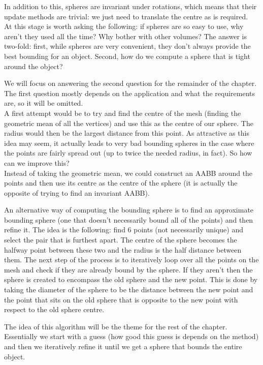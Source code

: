     In addition to this, spheres are invariant under rotations, which means that
    their update methods are trivial: we just need to translate the centre as is
    required.\\
    At this stage is worth asking the following: if spheres are so easy to use,
    why aren't they used all the time? Why bother with other volumes? The answer
    is two-fold: first, while spheres are very convenient, they don't always
    provide the best bounding for an object. Second, how do we compute a sphere
    that is tight around the object?

    We will focus on answering the second question for the remainder of the
    chapter. The first question mostly depends on the application and what the
    requirements are, so it will be omitted.\\
    A first attempt would be to try and find the centre of the mesh (finding
    the geometric mean of all the vertices) and use this as the centre of
    our sphere. The radius would then be the largest distance from this
    point. As attractive as this idea may seem, it actually leads to very
    bad bounding spheres in the case where the points are fairly spread out (up
    to twice the needed radius, in fact). So how can we improve this?\\
    Instead of taking the geometric mean, we could construct an AABB around the
    points and then use its centre as the centre of the sphere (it is actually
    the opposite of trying to find an invariant AABB).

    An alternative way of computing the bounding sphere is to find an
    approximate bounding sphere (one that doesn't necessarily bound all of
    the points) and then refine it. The idea is the following: find 6 points
    (not necessarily unique) and select the pair that is furthest apart. The
    centre of the sphere becomes the halfway point between these two and the
    radius is the half distance between them. The next step of the process
    is to iteratively loop over all the points on the mesh and check if they
    are already bound by the sphere. If they aren't then the sphere is
    created to encompass the old sphere and the new point. This is done by
    taking the diameter of the sphere to be the distance between the new
    point and the point that sits on the old sphere that is opposite to the
    new point with respect to the old sphere centre.

    The idea of this algorithm will be the theme for the rest of the chapter.
    Essentially we start with a guess (how good this guess is depends on the
    method) and then we iteratively refine it until we get a sphere that bounds
    the entire object.
